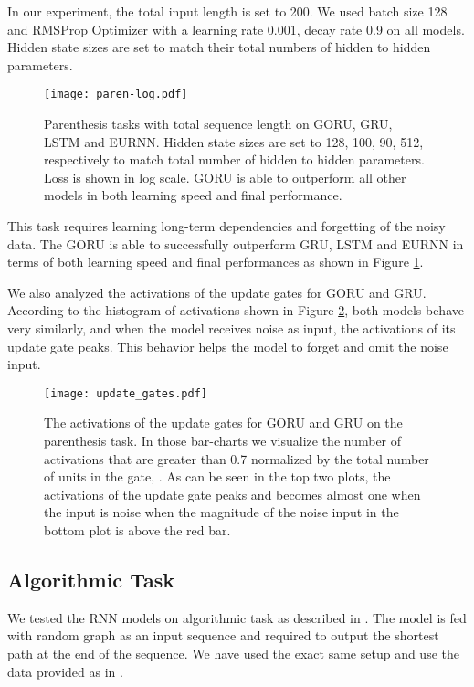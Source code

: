 \documentclass[letterpaper]{article} \usepackage{aaai18}  \usepackage{times}  \usepackage{helvet}  \usepackage{courier}  \usepackage{url}  \usepackage{graphicx}
\begin{document}
In our experiment, the total input length is set to 200. We used batch size 128 and RMSProp Optimizer with a learning rate 0.001, decay rate 0.9 on all models. Hidden state sizes are set to match their total numbers of hidden to hidden parameters.


\begin{figure}[h!]
\centering
\texttt{[image: paren-log.pdf]}
\caption{Parenthesis tasks with total sequence length  on GORU, GRU, LSTM and EURNN. Hidden state sizes are set to 128, 100, 90, 512, respectively to match total number of hidden to hidden parameters. Loss is shown in log scale. GORU is able to outperform all other models in both learning speed and final performance.}
\label{fig:paren}
\end{figure}

This task requires learning long-term dependencies and forgetting of the noisy data.
The GORU is able to successfully outperform GRU, LSTM and EURNN in terms of both learning speed and final performances as shown in Figure \ref{fig:paren}.

We also analyzed the activations of the update gates for GORU and GRU. According to the histogram of activations shown in Figure \ref{fig:bar}, both models behave very similarly, and when the model receives noise as input, the activations of its update gate peaks. This behavior helps the model to forget and omit the noise input.

\begin{figure}[h!]
\centering
\texttt{[image: update\_gates.pdf]}
\caption{The activations of the update gates for GORU and GRU on the parenthesis task. In those bar-charts we visualize the number of activations that are greater than 0.7 normalized by the total number of units in the gate, 
. 
As can be seen in the top two plots, the activations of the update gate peaks and becomes almost one when the input is noise when the magnitude of the noise input in the bottom plot is above the red bar.}
\label{fig:bar}
\end{figure}


\subsection{Algorithmic Task}
We tested the RNN models on algorithmic task as described in \cite{li2015gated}. The model is fed with random graph as an input sequence and required to output the shortest path at the end of the sequence. We have used the exact same setup and use the data provided as in \cite{li2015gated}. 
\end{document}

